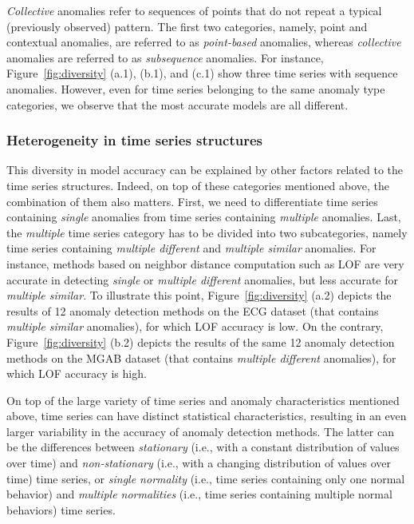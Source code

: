 \textit{Collective} anomalies refer to sequences of points that do not repeat a typical (previously observed) pattern. The first two categories, namely, point and contextual anomalies, are referred to as \textit{point-based} anomalies, whereas \textit{collective} anomalies are referred to as \textit{subsequence} anomalies. For instance, Figure~\ref{fig:diversity} (a.1), (b.1), and (c.1) show three time series with sequence anomalies. However, even for time series belonging to the same anomaly type categories, we observe that the most accurate models are all different.  

\subsubsection{\textbf{Heterogeneity in time series structures}}

This diversity in model accuracy can be explained by other factors related to the time series structures. Indeed, on top of these categories mentioned above, the combination of them also matters. First, we need to differentiate time series containing \textit{single} anomalies from time series containing \textit{multiple} anomalies. Last, the \textit{multiple} time series category has to be divided into two subcategories, namely time series containing \textit{multiple different} and \textit{multiple similar} anomalies. For instance, methods based on neighbor distance computation such as LOF are very accurate in detecting \textit{single} or \textit{multiple different} anomalies, but less accurate for \textit{multiple similar}. To illustrate this point, Figure~\ref{fig:diversity} (a.2) depicts the results of 12 anomaly detection methods on the ECG dataset (that contains  \textit{multiple similar} anomalies), for which LOF accuracy is low. On the contrary, Figure~\ref{fig:diversity} (b.2) depicts the results of the same 12 anomaly detection methods on the MGAB dataset (that contains \textit{multiple different} anomalies), for which LOF accuracy is high.

On top of the large variety of time series and anomaly characteristics mentioned above, time series can have distinct statistical characteristics, resulting in an even larger variability in the accuracy of anomaly detection methods. %
The latter can be the differences between \textit{stationary} (i.e., with a constant distribution of values over time) and \textit{non-stationary} (i.e., with a changing distribution of values over time) time series, or \textit{single normality} (i.e., time series containing only one normal behavior) and \textit{multiple normalities} (i.e., time series containing multiple normal behaviors) time series. 